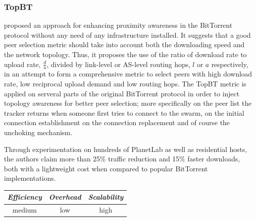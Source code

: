 \subsubsection{TopBT}
\cite{RTLCGZ2010} proposed an approach for enhancing proximity awareness
in the BitTorrent protocol without any need of any infrastructure installed. It
suggests that a good peer selection metric should take into account both the
downloading speed and the network topology. Thus, it proposes the use of the
ratio of download rate to upload rate, $\frac{d}{u}$, divided by link-level or
AS-level routing hops, $l$ or $a$ respectively, in an attempt to form a
comprehensive metric to select peers with high download rate, low reciprocal
upload demand and low routing hops. The TopBT metric is applied on serveral
parts of the original BitTorrent protocol in order to inject topology awareness
for better peer selection; more specifically on the peer list the tracker
returns when someone first tries to connect to the swarm, on the initial
connection establishment on the connection replacement and of course the
unchoking mechanism.


Through experimentation on hundreds of PlanetLab as well as residential hosts,
the authors claim more than 25\% traffic reduction and 15\% faster downloads,
both with a lightweight cost when compared to popular BitTorrent
implementations.

\begin{center}
\begin{tabular}{ccc}
\emph{Efficiency} & \emph{Overhead} & \emph{Scalability} \\
\hline
medium &
low &
high
\end{tabular}
\end{center}

